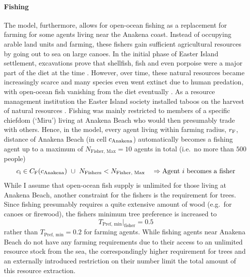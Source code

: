 \paragraph{Fishing}
The model, furthermore, allows for open-ocean fishing as a replacement for farming for some agents living near the Anakena coast.
Instead of occupying arable land units and farming, these fishers gain sufficient agricultural resources by going out to sea on large canoes.
In the initial phase of Easter Island settlement, excavations prove that shellfish, fish and even porpoise were a major part of the diet at the time \citep{Bahn2017}.
However, over time, these natural resources became increasingly scarce and many species even went extinct due to human predation, with open-ocean fish vanishing from the diet eventually \citep{Diamond2011}.
As a resource management institution the Easter Island society installed taboos on the harvest of natural resources \citep{Good2006}. 
Fishing was mainly restricted to members of a specific chiefdom (`Miru') living at Anakena Beach \citep{Bahn2017} who would then presumably trade with others.
Hence, in the model, every agent living within farming radius, $r_{\rm F}$, distance of Anakena Beach (in cell $c_{\rm Anakena}$) automatically becomes a fishing agent up to a maximum of $N_\text{Fisher, Max} = 10$ agents in total (i.e.\ no more than $500$ people)
\begin{equation}
 	c_{\rm i} \in C_{\rm F}(c_{\rm Anakena}) \  \cup \ N_\text{Fishers}<N_\text{Fisher, Max} \quad \Rightarrow \text{Agent }i\text{ becomes a fisher}
\end{equation}
While I assume that open-ocean fish supply is unlimited for those living at Anakena Beach, another constraint for the fishers is the requirement for trees.
Since fishing presumably requires a quite extensive amount of wood (e.g.\ for canoes or firewood), the fishers minimum tree preference is increased to
\begin{equation}
T_\text{Pref, min}|_\text{fisher} = 0.5
\end{equation} 
rather than $T_\text{Pref, min} = 0.2$ for farming agents.
While fishing agents near Anakena Beach do not have any farming requirements due to their access to an unlimited resource stock from the sea, the correspondingly higher requirement for trees and an externally introduced restriction on their number limit the total amount of this resource extraction.

